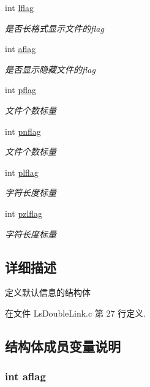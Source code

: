 \begin{DoxyCompactItemize}
int \hyperlink{structglobal_args__t_a4cc7e6867b564ffab9f569351d574a67}{lflag}
\begin{DoxyCompactList}\small\item\em 是否长格式显示文件的flag \end{DoxyCompactList}\item 
int \hyperlink{structglobal_args__t_a7b2a56cd9a79cbfd3f2bce4e463d9245}{aflag}
\begin{DoxyCompactList}\small\item\em 是否显示隐藏文件的flag \end{DoxyCompactList}\item 
int \hyperlink{structglobal_args__t_a3bf178baaa87d9153b6ef764640fe960}{pflag}
\begin{DoxyCompactList}\small\item\em 文件个数标量 \end{DoxyCompactList}\item 
int \hyperlink{structglobal_args__t_add78a9ef7e3c17ea829b2bd642cb54be}{pnflag}
\begin{DoxyCompactList}\small\item\em 文件个数标量 \end{DoxyCompactList}\item 
int \hyperlink{structglobal_args__t_a493e07ea63caf467c6817876a2e8a4ea}{plflag}
\begin{DoxyCompactList}\small\item\em 字符长度标量 \end{DoxyCompactList}\item 
int \hyperlink{structglobal_args__t_a96885a7ac3fa5bab18fe2f82df3bc938}{pzlflag}
\begin{DoxyCompactList}\small\item\em 字符长度标量 \end{DoxyCompactList}\end{DoxyCompactItemize}


\subsection{详细描述}
定义默认信息的结构体 

在文件 Ls\-Double\-Link.\-c 第 27 行定义.



\subsection{结构体成员变量说明}
\hypertarget{structglobal_args__t_a7b2a56cd9a79cbfd3f2bce4e463d9245}{
\subsubsection[{aflag}]{\setlength{\rightskip}{0pt plus 5cm}int aflag}}\label{structglobal_args__t_a7b2a56cd9a79cbfd3f2bce4e463d9245}


